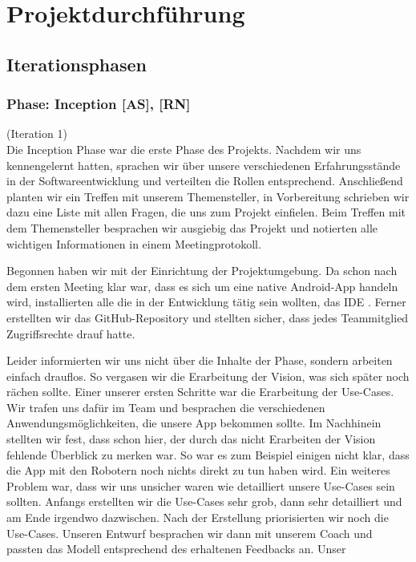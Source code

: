 \documentclass[10pt]{article}
\begin{document}
\newpage
\section{Projektdurchführung}
\subsection{Iterationsphasen}
\subsubsection{Phase: Inception [AS], [RN]}
(Iteration 1) \\
Die Inception Phase war die erste Phase des Projekts. Nachdem wir uns kennengelernt hatten, sprachen wir über
unsere verschiedenen Erfahrungsstände in der Softwareentwicklung und verteilten die Rollen entsprechend.
Anschließend planten wir ein Treffen
mit unserem Themensteller, in Vorbereitung schrieben wir dazu eine Liste mit allen Fragen, die uns zum Projekt einfielen.
Beim Treffen mit dem Themensteller besprachen wir ausgiebig das Projekt und notierten alle wichtigen Informationen
in einem Meetingprotokoll.\par
\medskip
Begonnen haben wir mit der Einrichtung der Projektumgebung. Da schon nach dem ersten Meeting klar war, dass es sich
um eine native Android-App handeln wird, installierten alle die in der Entwicklung tätig sein wollten, das IDE
. Ferner erstellten wir das GitHub-Repository und stellten sicher, dass jedes Teammitglied
Zugriffsrechte drauf hatte.\par
\medskip
Leider informierten wir uns nicht über die Inhalte der Phase, sondern arbeiten einfach drauflos.
So vergasen wir die Erarbeitung der Vision, was sich später noch rächen sollte.
Einer unserer ersten Schritte war die Erarbeitung der Use-Cases.
Wir trafen uns dafür im Team und besprachen die verschiedenen Anwendungsmöglichkeiten,
die unsere App bekommen sollte. Im Nachhinein stellten wir fest, dass schon hier, der durch das nicht
Erarbeiten der Vision fehlende Überblick zu merken war. So war es zum Beispiel einigen nicht klar, dass die
App mit den Robotern noch nichts direkt zu tun haben wird. Ein weiteres Problem war, dass wir uns unsicher waren
wie detailliert unsere Use-Cases sein sollten. Anfangs erstellten wir die Use-Cases sehr grob, dann sehr detailliert
und am Ende irgendwo dazwischen. Nach der Erstellung priorisierten wir noch die Use-Cases. Unseren Entwurf besprachen
wir dann mit unserem Coach und passten das Modell entsprechend des erhaltenen Feedbacks an. Unser
\end{document}
